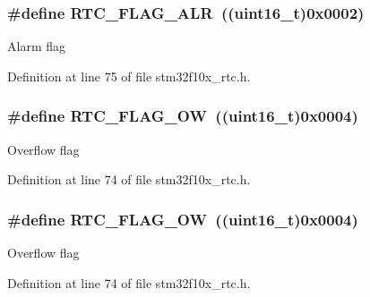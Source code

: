 \subsubsection[{\texorpdfstring{R\+T\+C\+\_\+\+F\+L\+A\+G\+\_\+\+A\+LR}{RTC_FLAG_ALR}}]{\setlength{\rightskip}{0pt plus 5cm}\#define R\+T\+C\+\_\+\+F\+L\+A\+G\+\_\+\+A\+LR~(({\bf uint16\+\_\+t})0x0002)}\hypertarget{group___r_t_c__interrupts__flags_gaed4375a7ea5a147f83c6cf4bfa805caf}{}\label{group___r_t_c__interrupts__flags_gaed4375a7ea5a147f83c6cf4bfa805caf}
Alarm flag 

Definition at line 75 of file stm32f10x\+\_\+rtc.\+h.

\subsubsection[{\texorpdfstring{R\+T\+C\+\_\+\+F\+L\+A\+G\+\_\+\+OW}{RTC_FLAG_OW}}]{\setlength{\rightskip}{0pt plus 5cm}\#define R\+T\+C\+\_\+\+F\+L\+A\+G\+\_\+\+OW~(({\bf uint16\+\_\+t})0x0004)}\hypertarget{group___r_t_c__interrupts__flags_ga4e321e359b914d7ed10eed985f8b4811}{}\label{group___r_t_c__interrupts__flags_ga4e321e359b914d7ed10eed985f8b4811}
Overflow flag 

Definition at line 74 of file stm32f10x\+\_\+rtc.\+h.

\subsubsection[{\texorpdfstring{R\+T\+C\+\_\+\+F\+L\+A\+G\+\_\+\+OW}{RTC_FLAG_OW}}]{\setlength{\rightskip}{0pt plus 5cm}\#define R\+T\+C\+\_\+\+F\+L\+A\+G\+\_\+\+OW~(({\bf uint16\+\_\+t})0x0004)}\hypertarget{group___r_t_c__interrupts__flags_ga4e321e359b914d7ed10eed985f8b4811}{}\label{group___r_t_c__interrupts__flags_ga4e321e359b914d7ed10eed985f8b4811}
Overflow flag 

Definition at line 74 of file stm32f10x\+\_\+rtc.\+h.

